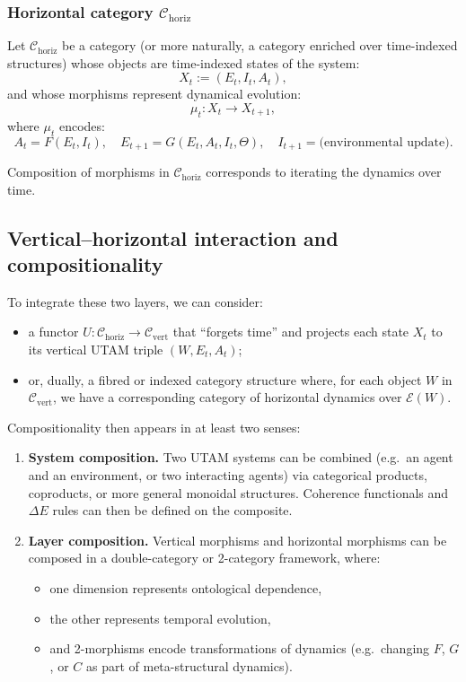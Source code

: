 \documentclass[12pt,a4paper]{report}
\begin{document}
\subsubsection*{Horizontal category \(\mathcal{C}_{\mathrm{horiz}}\)}

Let \(\mathcal{C}_{\mathrm{horiz}}\) be a category (or more naturally, a category enriched over time-indexed structures) whose objects are time-indexed states of the system:
\[
    X_t := (E_t, I_t, A_t),
\]
and whose morphisms represent dynamical evolution:
\[
    \mu_t : X_t \to X_{t+1},
\]
where \(\mu_t\) encodes:
\[
    A_t = F(E_t, I_t), \quad
    E_{t+1} = G(E_t, A_t, I_t, \Theta), \quad
    I_{t+1} = \text{(environmental update)}.
\]

Composition of morphisms in \(\mathcal{C}_{\mathrm{horiz}}\) corresponds to iterating the dynamics over time.

\subsection*{Vertical–horizontal interaction and compositionality}

To integrate these two layers, we can consider:

\begin{itemize}[leftmargin=2em]
    \item a functor \(U : \mathcal{C}_{\mathrm{horiz}} \to \mathcal{C}_{\mathrm{vert}}\) that ``forgets time'' and projects each state \(X_t\) to its vertical UTAM triple \((W, E_t, A_t)\);
    \item or, dually, a fibred or indexed category structure where, for each object \(W\) in \(\mathcal{C}_{\mathrm{vert}}\), we have a corresponding category of horizontal dynamics over \(\mathcal{E}(W)\).
\end{itemize}

Compositionality then appears in at least two senses:

\begin{enumerate}[leftmargin=2em]
    \item \textbf{System composition.} Two UTAM systems can be combined (e.g.\ an agent and an environment, or two interacting agents) via categorical products, coproducts, or more general monoidal structures. Coherence functionals and $\Delta E$ rules can then be defined on the composite.
    \item \textbf{Layer composition.} Vertical morphisms and horizontal morphisms can be composed in a double-category or 2-category framework, where:
    \begin{itemize}
        \item one dimension represents ontological dependence,
        \item the other represents temporal evolution,
        \item and 2-morphisms encode transformations of dynamics (e.g.\ changing \(F\), \(G\), or \(C\) as part of meta-structural dynamics).
    \end{itemize}
\end{enumerate}
\end{document}

